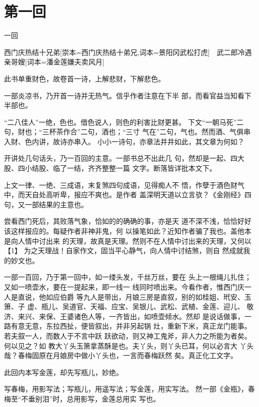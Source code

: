 \documentclass[UTF8,scheme=chinese,11pt,linespread=1.4]{ctexbook}
\makeatletter
\newcommand{\banbenzhuce}[1]{}
\newcommand{\banben}[2][]{#2}
\newenvironment{diben}[1]
  {\list{}{\listparindent 2em
    \itemindent\listparindent
    \rightmargin 0em  %
    \leftmargin 0em  %
    \parsep \z@ \@plus\p@}%
   \item\relax}
  {\endlist}
\makeatother
\begin{document}
\banbenzhuce{词本,崇本}

\chapter{第一回}

\begin{diben}
第一回

\banben{西门庆热结十兄弟}[崇本={西门庆热结十弟兄},词本={景阳冈武松打虎}]　\banben{武二郎冷遇亲哥嫂}[词本={潘金莲嫌夫卖风月}]

此书单重财色，故卷首一诗，上解悲财，下解悲色。

一部炎凉书，乃开首一诗并无热气。信乎作者注意在下半
部，而看官益当知看下半部也。

“二八佳人”一绝，色也。借色说人，则色的利害比财更甚。
下文“一朝马死”二句，财也；“三杯茶作合”二句，酒也；“三寸
气在”二句，气也。然而酒、气俱串入财、色内讲，故诗亦串入。
小小一诗句，亦章法井井如此，其文章为何如？

开讲处几句话头，乃一百回的主意。一部书总不出此几
句，然却是一起、四大股、四小结股、临了一结，齐齐整整一篇
文字。断落皆详批本文下。

上文一律、一绝、三成语，末复煞四句成语，见得痴人不
悟，作孽于酒色财气中，而天自处高听卑，报应不爽也。是作者
盖深明天道以立言欤？《金刚经》四句，又一部结果的主意也。

尝看西门死后，其败落气象，恰如的的确确的事，亦是天
道不深不浅，恰恰好好该这样报应的。每疑作者非神非鬼，何
以操笔如此？近知作者骗了我也。盖他本是向人情中讨出来
的天理，故真是天理。然则不在人情中讨出来的天理，又何以【1】
为之天理战！自家作文，固当平心静气，向人情中讨结煞，则自
然成就我的妙文也。

一部一百回，乃于第一回中，如一缕头发，千丝万丝，要在
头上一根绳儿扎住；又如一喷壶水，要在一提起来，即一线一
线同时喷出来。今看作者，惟西门庆一人是直说，他如应伯爵
等九人是带出，月娘三房是直叙，别的如桂姐、玳安、玉箫、子
虚、瓶儿、吴道官、天福、应宝、吴银儿、武松、武植、金莲、迎儿、
敬济、来兴、来保、王婆诸色人等，一齐皆出，如喷壶倾水。然却
是说话做事，一路有意无意，东拉西扯，便皆叙出，并非另起锅
灶，重新下米，真正龙门能事。若夫叙一人，而数人于不言中跃
跃欲动，则又神工鬼斧，非人力之所能为者矣。何以见之？如
教大丫头玉箫拿蒸酥是也。夫丫头，则丫头已耳，何以必言大
丫头哉？春梅固原在月娘房中做小丫头也，一言而春梅跃然
矣。真正化工文字。

此回内本写金莲，却先写瓶儿，妙绝。

写春梅，用影写法；写瓶儿，用遥写法；写金莲，用实写法。
然一部《金瓶》，春梅至“不垂别泪”时，总用影写，金莲总用实
写也。


\end{diben}
\end{document}
